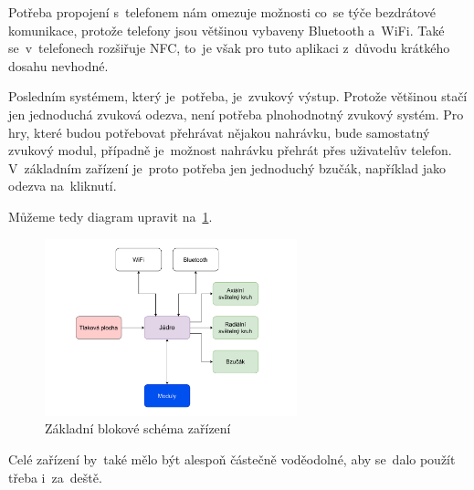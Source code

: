 Potřeba propojení s~telefonem nám omezuje možnosti co~se týče bezdrátové komunikace, protože telefony jsou většinou vybaveny Bluetooth a~WiFi.
Také se~v~telefonech rozšiřuje NFC, to~je však pro tuto aplikaci z~důvodu krátkého dosahu nevhodné.

Posledním systémem, který je~potřeba, je~zvukový výstup.
Protože většinou stačí jen jednoduchá zvuková odezva, není potřeba plnohodnotný zvukový systém.
Pro hry, které budou potřebovat přehrávat nějakou nahrávku, bude samostatný zvukový modul, případně je~možnost nahrávku přehrát přes uživatelův telefon.
V~základním zařízení je~proto potřeba jen jednoduchý bzučák, například jako odezva na~kliknutí.

Můžeme tedy diagram upravit na~\ref{fig:diagram_zanoreni_1}.
\begin{figure}[h]
    \centering
    \includegraphics[width=0.65\textwidth]{text/TeoretickyUvod/AplikaceHernichZarizeni/diagram/zanoreni_1.pdf}
    \caption{Základní blokové schéma zařízení}
    \label{fig:diagram_zanoreni_1}
\end{figure}

Celé zařízení by~také mělo být alespoň částečně voděodolné, aby se~dalo použít třeba i~za~deště.

\vspace{-10mm}